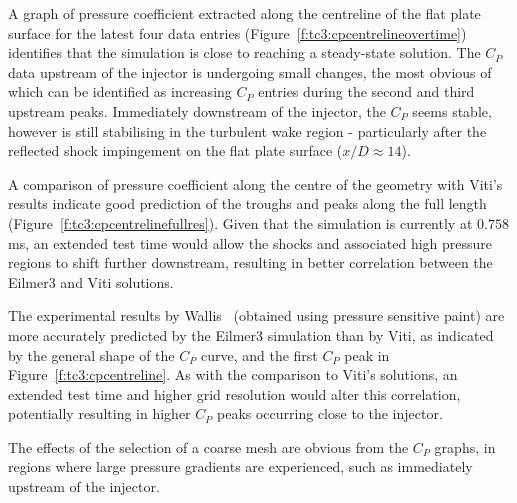 \newpage
A graph of pressure coefficient extracted along the centreline of the flat plate surface for the latest four data entries (Figure~\ref{f:tc3:cpcentrelineovertime}) identifies that the simulation is close to reaching a steady-state solution. The $C_P$ data upstream of the injector is undergoing small changes, the most obvious of which can be identified as increasing $C_P$ entries during the second and third upstream peaks. Immediately downstream of the injector, the $C_P$ seems stable, however is still stabilising in the turbulent wake region - particularly after the reflected shock impingement on the flat plate surface ($x/D\approx14$).

A comparison of pressure coefficient along the centre of the geometry with Viti's~\cite{schetz2009} results indicate good prediction of the troughs and peaks along the full length (Figure~\ref{f:tc3:cpcentrelinefullres}). Given that the simulation is currently at $0.758$\,ms, an extended test time would allow the shocks and associated high pressure regions to shift further downstream, resulting in better correlation between the Eilmer3 and Viti solutions. 

The experimental results by Wallis~\cite{wallis2001} (obtained using pressure sensitive paint) are more accurately predicted by the Eilmer3 simulation than by Viti, as indicated by the general shape of the $C_P$ curve, and the first $C_P$ peak in Figure~\ref{f:tc3:cpcentreline}. As with the comparison to Viti's solutions, an extended test time and higher grid resolution would alter this correlation, potentially resulting in higher $C_P$ peaks occurring close to the injector.

The effects of the selection of a coarse mesh are obvious from the $C_P$ graphs, in regions where large pressure gradients are experienced, such as immediately upstream of the injector.

